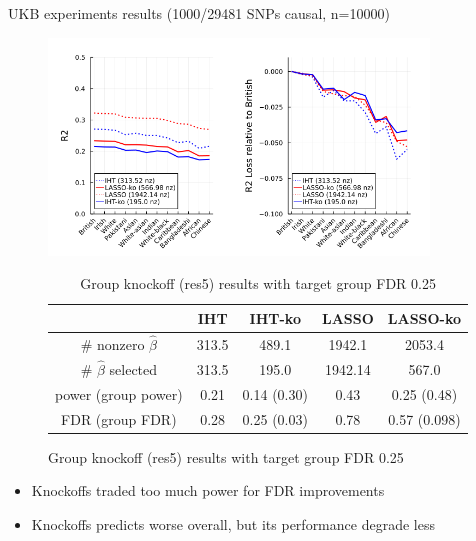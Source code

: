 \documentclass[aspectratio=169, 10pt]{beamer}
\begin{document}
\begin{frame}{UKB experiments results (1000/29481 SNPs causal, n=10000)}
    \begin{minipage}[b]{0.65\linewidth}
        \begin{figure}
            \centering
            \includegraphics[width=0.9\textwidth]{figures/k1000_n10000.png}
            \begin{table}[]
                \centering
                \small
                \begin{tabular}{c|c|c|c|c}
                & IHT & IHT-ko & LASSO & LASSO-ko\\
                \hline
                 \# nonzero $\hat{\beta}$ & 313.5 & 489.1 & 1942.1 & 2053.4\\
                 \# $\hat{\beta}$ selected & 313.5 & 195.0 & 1942.14 & 567.0\\
                 power (group power) & 0.21 & 0.14 (0.30) & 0.43 & 0.25 (0.48)\\
                 FDR (group FDR) & 0.28 & 0.25 (0.03) & 0.78 & 0.57 (0.098)\\
                 \hline
            \end{tabular}
            \caption{Group knockoff (res5) results with target group FDR 0.25}
    \end{table}
    \end{figure}
    
    \end{minipage}
    \hspace{0.5cm}
    \begin{minipage}[b]{0.25\linewidth}
        \begin{itemize}
            \item \alert{Knockoffs traded too much power for FDR improvements}
            \item Knockoffs predicts worse overall, but its performance degrade less
        \end{itemize}
        \vspace{3cm}
    \end{minipage}
\end{frame}
\end{document}
